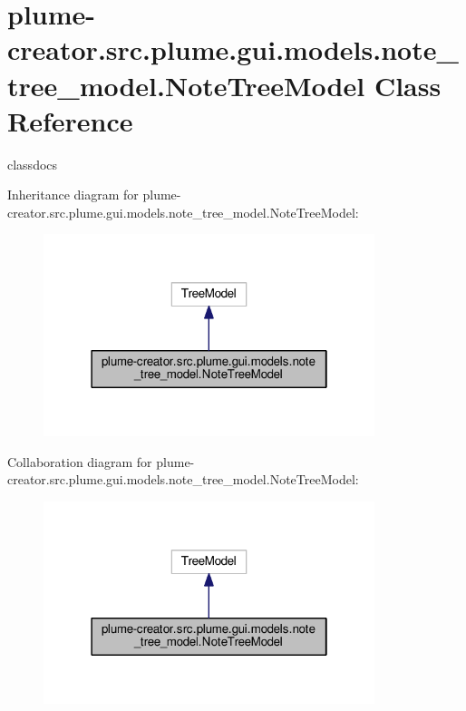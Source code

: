 \hypertarget{classplume-creator_1_1src_1_1plume_1_1gui_1_1models_1_1note__tree__model_1_1_note_tree_model}{}\section{plume-\/creator.src.\+plume.\+gui.\+models.\+note\+\_\+tree\+\_\+model.\+Note\+Tree\+Model Class Reference}
\label{classplume-creator_1_1src_1_1plume_1_1gui_1_1models_1_1note__tree__model_1_1_note_tree_model}


classdocs  




Inheritance diagram for plume-\/creator.src.\+plume.\+gui.\+models.\+note\+\_\+tree\+\_\+model.\+Note\+Tree\+Model\+:\nopagebreak
\begin{figure}[H]
\begin{center}
\leavevmode
\includegraphics[width=274pt]{classplume-creator_1_1src_1_1plume_1_1gui_1_1models_1_1note__tree__model_1_1_note_tree_model__inherit__graph}
\end{center}
\end{figure}


Collaboration diagram for plume-\/creator.src.\+plume.\+gui.\+models.\+note\+\_\+tree\+\_\+model.\+Note\+Tree\+Model\+:\nopagebreak
\begin{figure}[H]
\begin{center}
\leavevmode
\includegraphics[width=274pt]{classplume-creator_1_1src_1_1plume_1_1gui_1_1models_1_1note__tree__model_1_1_note_tree_model__coll__graph}
\end{center}
\end{figure}
